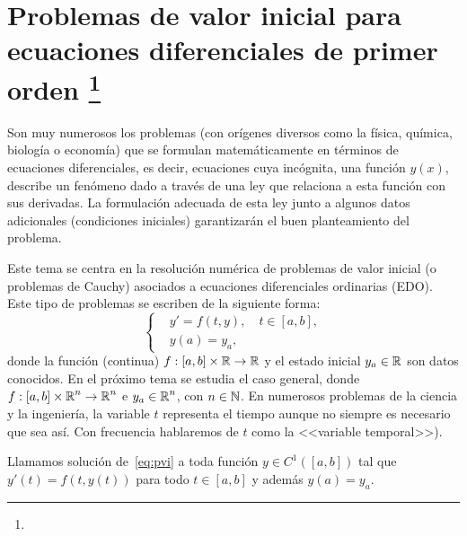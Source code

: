 \renewcommand{\tt}{t}
\newcommand{\yy}{y}
\newcommand{\yn}{{\yy_n}}
\newcommand{\ynn}{{\yy_{n+1}}}
\newcommand{\ta}{a}
\newcommand{\tb}{b}
\newcommand{\tn}{{\tt_n}}
\newcommand{\tnn}{{\tt_{n+1}}}
\newcommand{\ycero}{{y_a}}
\newcommand{\sol}{y}
\newcommand{\lipschitz}{Lipschitz\xspace}
\newcommand{\globLipschitz}{$y$--\lipschitz}
\newcommand{\locLipschitz}{localmente $y$--\lipschitz}

\chapter[Problemas de valor inicial para EDOs de primer orden]
{Problemas de valor inicial para ecuaciones diferenciales de primer
  orden%
  \footnote{\licenseInfo}}

Son muy numerosos los problemas (con orígenes diversos como la física,
química, biología o economía) que se formulan matemáticamente en
términos de ecuaciones diferenciales, es decir, ecuaciones cuya
incógnita, una función $y(x)$, describe un fenómeno dado a través de
una ley que relaciona a esta función con sus derivadas. La formulación
adecuada de esta ley junto a algunos datos adicionales (condiciones
iniciales) garantizarán el buen planteamiento del problema.

Este tema se centra en la resolución numérica de problemas de valor
inicial (o problemas de Cauchy) asociados a ecuaciones diferenciales
ordinarias (EDO). Este tipo de problemas se escriben de la siguiente
forma:
\begin{equation}
  \label{eq:pvi}
  \tag{PVI}
  \left\{
  \begin{aligned}
    &y' = f(\tt,\yy), \quad \tt\in[\ta,\tb],
    \\
    &y(\ta) = \ycero,
  \end{aligned}
  \right.
\end{equation}
donde la función (continua) $f:[\ta,\tb]\times\Rset\to\Rset$ y el
estado inicial $\ycero\in\Rset$ son datos conocidos. En el próximo
tema se estudia el caso general, donde
$f:[\ta,\tb]\times\Rset^n\to\Rset^n$ e $\ycero\in\Rset^n$, con
$n\in\operatorname{{\mathbb N}}$. En numerosos problemas de la ciencia y la ingeniería, la
variable $\tt$ representa el tiempo aunque no siempre es necesario que
sea así. Con frecuencia hablaremos de $\tt$ como la <<variable
temporal>>).

\begin{definition}
  Llamamos solución de~\eqref{eq:pvi} a toda función $\sol\in
  C^1([\ta,\tb])$ tal que $\sol'(\tt)=f(\tt,\sol(\tt))$ para todo
  $\tt\in[\ta,\tb]$ y además $\sol(\ta)=\ycero$.\label{def:3}
\end{definition}


